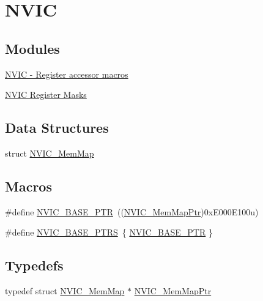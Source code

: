 \hypertarget{group___n_v_i_c___peripheral}{}\section{N\+V\+I\+C}
\label{group___n_v_i_c___peripheral}
\subsection*{Modules}
\begin{DoxyCompactItemize}
\item 
\hyperlink{group___n_v_i_c___register___accessor___macros}{N\+V\+I\+C -\/ Register accessor macros}
\item 
\hyperlink{group___n_v_i_c___register___masks}{N\+V\+I\+C Register Masks}
\end{DoxyCompactItemize}
\subsection*{Data Structures}
\begin{DoxyCompactItemize}
\item 
struct \hyperlink{struct_n_v_i_c___mem_map}{N\+V\+I\+C\+\_\+\+Mem\+Map}
\end{DoxyCompactItemize}
\subsection*{Macros}
\begin{DoxyCompactItemize}
\item 
\#define \hyperlink{group___n_v_i_c___peripheral_ga28f0a055d0c218e16d1fc7b13ff0caa5}{N\+V\+I\+C\+\_\+\+B\+A\+S\+E\+\_\+\+P\+T\+R}~((\hyperlink{group___n_v_i_c___peripheral_ga685d87c766bb24fb3330aa8cc48fa0e7}{N\+V\+I\+C\+\_\+\+Mem\+Map\+Ptr})0x\+E000\+E100u)
\item 
\#define \hyperlink{group___n_v_i_c___peripheral_ga25b6ce0c871e09199e515cbb1716fe26}{N\+V\+I\+C\+\_\+\+B\+A\+S\+E\+\_\+\+P\+T\+R\+S}~\{ \hyperlink{group___n_v_i_c___peripheral_ga28f0a055d0c218e16d1fc7b13ff0caa5}{N\+V\+I\+C\+\_\+\+B\+A\+S\+E\+\_\+\+P\+T\+R} \}
\end{DoxyCompactItemize}
\subsection*{Typedefs}
\begin{DoxyCompactItemize}
\item 
typedef struct \hyperlink{struct_n_v_i_c___mem_map}{N\+V\+I\+C\+\_\+\+Mem\+Map} $\ast$ \hyperlink{group___n_v_i_c___peripheral_ga685d87c766bb24fb3330aa8cc48fa0e7}{N\+V\+I\+C\+\_\+\+Mem\+Map\+Ptr}
\end{DoxyCompactItemize}


